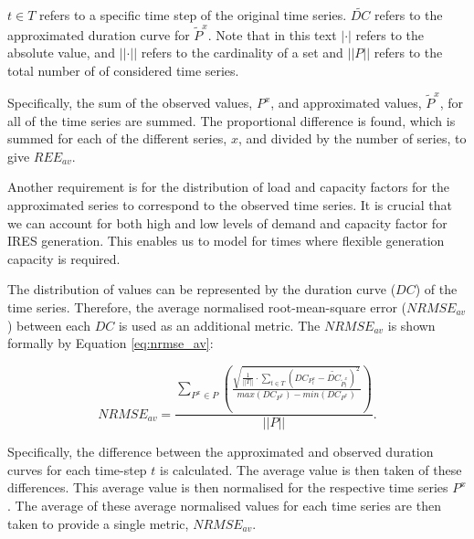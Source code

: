 $t\in T$ refers to a specific time step of the original time series. $\widetilde{DC}$ refers to the approximated duration curve for $\widetilde{P}^x$. Note that in this text $\left|\cdot\right|$ refers to the absolute value, and $\left|\left|\cdot\right|\right|$ refers to the cardinality of a set and $\left|\left|P\right|\right|$ refers to the total number of of considered time series.

Specifically, the sum of the observed values, $P^x$, and approximated values, $\widetilde P^x$, for all of the time series are summed. The proportional difference is found, which is summed for each of the different series, $x$, and divided by the number of series, to give $REE_{av}$.







Another requirement is for the distribution of load and capacity factors for the approximated series to correspond to the observed time series. It is crucial that we can account for both high and low levels of demand and capacity factor for IRES generation. This enables us to model for times where flexible generation capacity is required.

The distribution of values can be represented by the duration curve ($DC$) of the time series. Therefore, the average normalised root-mean-square error ($NRMSE_{av}$) between each $DC$ is used as an additional metric. The $NRMSE_{av}$ is shown formally by Equation \ref{eq:nrmse_av}:

\begin{equation}
\label{eq:nrmse_av}
NRMSE_{av}=\frac
{\sum\limits_{P^x{\in} P}\left(\frac
	{\sqrt{
			\frac{1}{\left|\left|T\right|\right|}
			\cdot
			\sum\limits_{t\in T}(DC_{P^x_t}-\widetilde{DC}_{\widetilde{P}^x_t})^2}
	}
	{max(DC_{P^x})-min(DC_{P^x})}
	\right)}
{\left|\left|P\right|\right|}.
\end{equation}

Specifically, the difference between the approximated and observed duration curves for each time-step $t$ is calculated. The average value is then taken of these differences. This average value is then normalised for the respective time series $P^x$. The average of these average normalised values for each time series are then taken to provide a single metric, $NRMSE_{av}$.



